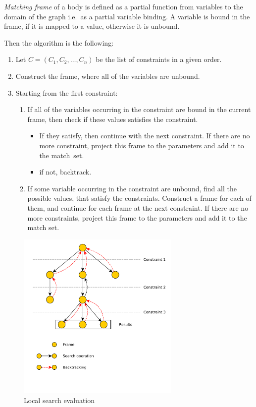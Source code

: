\emph{Matching frame} of a body is defined as a partial function from variables to the domain of the graph i.e.\ as a partial variable binding.
A variable is bound in the frame, if it is mapped to a value, otherwise it is unbound.

Then the algorithm is the following:
\begin{enumerate}
	
\item
Let $C = (C_1, C_2, \dots{}, C_n )$ be the list of constraints in a given order.

\item 
Construct the frame, where all of the variables are unbound.

\item 
Starting from the first constraint:
	\begin{enumerate}
		\item 
		If all of the variables occurring in the constraint are bound in the current frame, then check if these values satisfies the constraint. 
		\begin{itemize}
			\item If they satisfy, then continue with the next constraint. If there are no more constraint, project this frame to the parameters and add it to the \mbox{match set}.
			\item if not, backtrack.
		\end{itemize}
		
		\item 
		If some variable occurring in the constraint are unbound, find all the possible values, that satisfy the constraints.
		Construct a frame for each of them, and continue for each frame at the next constraint. If there are no more constraints, project this frame to the parameters and add it to the match set.	
	\end{enumerate}	
\end{enumerate}
	
	
\begin{figure}[h]
	\begin{center}
		\includegraphics[width=0.7\textwidth]{figures/localsearch.pdf}
		\caption{Local search evaluation}
		\label{fig:localsearch}
	\end{center}
\end{figure}
	
